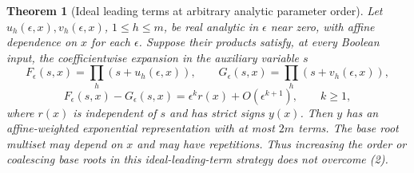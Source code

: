 \documentclass[11pt]{article}
\newtheorem{theorem}{Theorem}
\begin{document}
\begin{theorem}[Ideal leading terms at arbitrary analytic parameter order]
Let $u_h(\epsilon,x),v_h(\epsilon,x)$, $1\le h\le m$, be real
analytic in $\epsilon$ near zero, with affine dependence on $x$
for each $\epsilon$. Suppose their products satisfy, at every Boolean
input, the coefficientwise expansion in the auxiliary variable $s$
\[
 F_\epsilon(s,x)=\prod_h(s+u_h(\epsilon,x)),\qquad
 G_\epsilon(s,x)=\prod_h(s+v_h(\epsilon,x)),
\]
\[
 F_\epsilon(s,x)-G_\epsilon(s,x)
    =\epsilon^k r(x)+O(\epsilon^{k+1}),\qquad k\ge1,
\tag{11}
\]
where $r(x)$ is independent of $s$ and has strict signs $y(x)$.
Then $y$ has an affine-weighted exponential representation with at
most $2m$ terms. The base root multiset may depend on $x$ and may
have repetitions. Thus increasing the order or coalescing base roots
in this ideal-leading-term strategy does not overcome (2).
\end{theorem}
\end{document}
